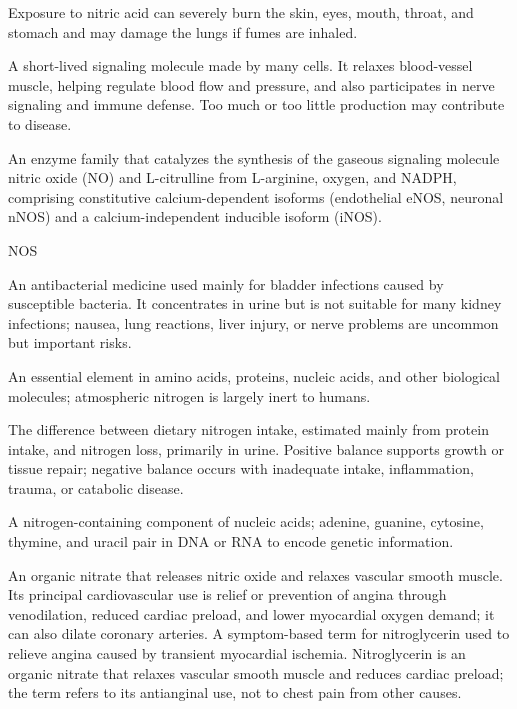  Exposure to nitric acid can severely burn the skin, eyes, mouth, throat, and stomach and may damage the lungs if fumes are inhaled.

 A short-lived signaling molecule made by many cells. It relaxes blood-vessel muscle, helping regulate blood flow and pressure, and also participates in nerve signaling and immune defense. Too much or too little production may contribute to disease.

 An enzyme family that catalyzes the synthesis of the gaseous signaling molecule nitric oxide (NO) and L-citrulline from L-arginine, oxygen, and NADPH, comprising constitutive calcium-dependent isoforms (endothelial eNOS, neuronal nNOS) and a calcium-independent inducible isoform (iNOS).

\synonyms
NOS

 An antibacterial medicine used mainly for bladder infections caused by susceptible bacteria. It concentrates in urine but is not suitable for many kidney infections; nausea, lung reactions, liver injury, or nerve problems are uncommon but important risks.

 An essential element in amino acids, proteins, nucleic acids, and other biological molecules; atmospheric nitrogen is largely inert to humans.

 The difference between dietary nitrogen intake, estimated mainly from protein intake,
and nitrogen loss, primarily in urine. Positive balance supports growth or tissue
repair; negative balance occurs with inadequate intake, inflammation, trauma, or
catabolic disease.

 A nitrogen-containing component of nucleic acids; adenine, guanine, cytosine, thymine, and uracil pair in DNA or RNA to encode genetic information.

 An organic nitrate that releases nitric oxide and relaxes vascular smooth muscle. Its principal cardiovascular use is relief or prevention of angina through venodilation, reduced cardiac preload, and lower myocardial oxygen demand; it can also dilate coronary arteries.
 A symptom-based term for nitroglycerin used to relieve angina caused by transient myocardial ischemia. Nitroglycerin is an organic nitrate that relaxes vascular smooth muscle and reduces cardiac preload; the term refers to its antianginal use, not to chest pain from other causes.

